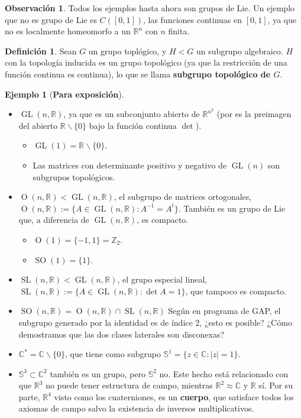 \documentclass[spanish]{article}
\theoremstyle{definition}
\newtheorem*{defn}{Definición}
\newtheorem*{obs}{Observación}
\newtheorem*{ejem}{Ejemplo}
\newcommand{\R}{\mathbb{R}}
\newcommand{\Z}{\mathbb{Z}}
\newcommand{\C}{\mathbb{C}}
\newcommand{\SP}{\mathbb{S}}
\DeclareMathOperator{\GL}{GL}
\DeclareMathOperator{\SL}{SL}
\DeclareMathOperator{\Or}{O}
\DeclareMathOperator{\SO}{SO}
\begin{document}
\begin{obs}
	Todos los ejemplos hasta ahora son grupos de Lie. Un ejemplo que no es grupo de Lie es $C([0,1])$, las funciones continuas en $[0,1]$, ya que no es localmente homeomorfo a un $\R^n$ con $n$ finita.
\end{obs}
\begin{defn}
	Sean $G$ un grupo toplógico, y $H<G$ un subgrupo algebraico. $H$ con la topología inducida es un grupo topológico (ya que la restricción de una función continua es continua), lo que se llama \textbf{subgrupo topológico de $G$}.
\end{defn}
\begin{ejem}[\textbf{Para exposición}]\leavevmode
	\begin{itemize}
		\item $\GL(n,\R)$, ya que es un subconjunto abierto de $\R^{n^2}$ (por es la preimagen del abierto $\R\backslash\{0\}$ bajo la función continua $\det$).
		\begin{itemize}
			\item $\GL(1)=\R\backslash\{0\}$. 
			\item Las matrices con determinante positivo y negativo de $\GL(n)$ son subgrupos topológicos.
		\end{itemize}
		\item $\Or(n,\R)<\GL(n,\R)$, el subgrupo de matrices ortogonales, $\Or(n,\R):=\{A\in\GL(n,\R): A^{-1}=A^t\}$. También es un grupo de Lie que, a diferencia de $\GL(n,\R)$, es compacto.
		\begin{itemize}
			\item $\Or(1)=\{-1,1\}=\Z_2$.
			\item $\SO(1)=\{1\}$.
		\end{itemize}
		\item $\SL(n,\R)<\GL(n,\R)$, el grupo especial lineal, $\SL(n,\R):=\{A\in\GL(n,\R):\det A=1\}$, que tampoco es compacto.
		\item $\SO(n,\R)=\Or(n,\R)\cap\SL(n,\R)$ Según en programa de GAP, el subgrupo generado por la identidad es de índice 2, ¿esto es posible? ¿Cómo demostramos que las dos clases laterales son disconexas?
		\item $\C^*=\C\backslash\{0\}$, que tiene como subgrupo $\SP ^1=\{z\in\C:|z|=1\}$.
		\item $\SP^3\subset\C^2$ también es un grupo, pero $\SP^2$ no. Este hecho está relacionado con que $\R^3$ no puede tener estructura de campo, mientras $\R^2\approx\C$ y $\R$ sí. Por su parte, $\R^4$ visto como los cuaterniones, es un \textbf{cuerpo}, que satisface todos los axiomas de campo salvo la existencia de inversos multiplicativos.
	\end{itemize}
\end{ejem}
\end{document}
